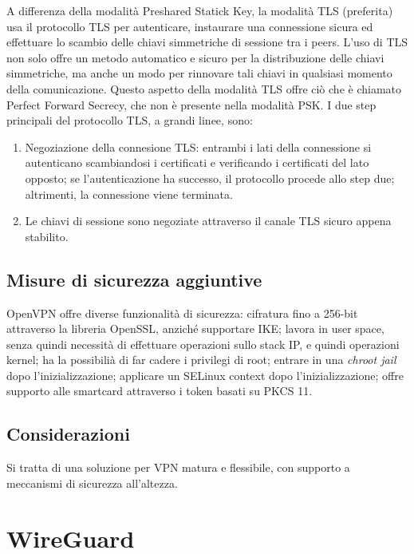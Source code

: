 A differenza della modalità Preshared Statick Key, la modalità TLS (preferita) usa il protocollo TLS per autenticare, instaurare una connessione sicura ed effettuare lo scambio delle chiavi simmetriche di sessione tra i peers. L'uso di TLS non solo offre un metodo automatico e sicuro per la distribuzione delle chiavi simmetriche, ma anche un modo per rinnovare tali chiavi in qualsiasi momento della comunicazione.
Questo aspetto della modalità TLS offre ciò che è chiamato Perfect Forward Secrecy, che non è presente nella modalità PSK.
I due step principali del protocollo TLS, a grandi linee, sono:

\begin{enumerate}
    \item Negoziazione della connesione TLS: entrambi i lati della connessione si autenticano scambiandosi i certificati e verificando i certificati del lato opposto; se l'autenticazione ha successo, il protocollo procede allo step due; altrimenti, la connessione viene terminata.
    \item Le chiavi di sessione sono negoziate attraverso il canale TLS sicuro appena stabilito.
\end{enumerate}


\subsection{Misure di sicurezza aggiuntive}
OpenVPN offre diverse funzionalità di sicurezza: cifratura fino a 256-bit attraverso la libreria OpenSSL, anziché supportare IKE; lavora in user space, senza quindi necessità di effettuare operazioni sullo stack IP, e quindi operazioni kernel; ha la possibilià di far cadere i privilegi di root; entrare in una \emph{chroot jail} dopo l'inizializzazione; applicare un SELinux context dopo l'inizializzazione; offre supporto alle smartcard attraverso i token basati su PKCS 11.

\subsection{Considerazioni}
Si tratta di una soluzione per VPN matura e flessibile, con supporto a meccanismi di sicurezza all'altezza.

\section{WireGuard}
